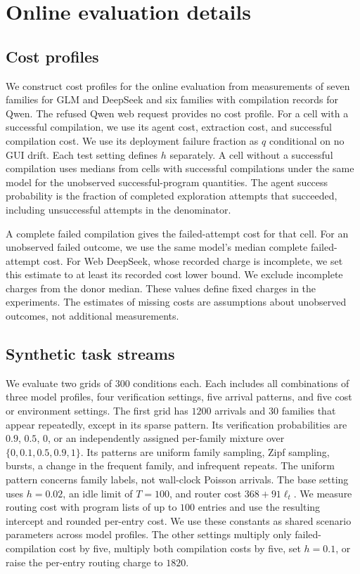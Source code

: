 \section{Online evaluation details}\label{app:simulation-details}

\subsection{Cost profiles}
\label{app:cost-profiles}

We construct cost profiles for the online evaluation from measurements of seven families for GLM and DeepSeek and six families with compilation records for Qwen.
The refused Qwen web request provides no cost profile.
For a cell with a successful compilation, we use its agent cost, extraction cost, and successful compilation cost.
We use its deployment failure fraction as $q$ conditional on no GUI drift.
Each test setting defines $h$ separately.
A cell without a successful compilation uses medians from cells with successful compilations under the same model for the unobserved successful-program quantities.
The agent success probability is the fraction of completed exploration attempts that succeeded, including unsuccessful attempts in the denominator.

A complete failed compilation gives the failed-attempt cost for that cell.
For an unobserved failed outcome, we use the same model's median complete failed-attempt cost.
For Web DeepSeek, whose recorded charge is incomplete, we set this estimate to at least its recorded cost lower bound.
We exclude incomplete charges from the donor median.
These values define fixed charges in the experiments.
The estimates of missing costs are assumptions about unobserved outcomes, not additional measurements.

\subsection{Synthetic task streams}
We evaluate two grids of $300$ conditions each.
Each includes all combinations of three model profiles, four verification settings, five arrival patterns, and five cost or environment settings.
The first grid has $1200$ arrivals and $30$ families that appear repeatedly, except in its sparse pattern.
Its verification probabilities are $0.9$, $0.5$, $0$, or an independently assigned per-family mixture over $\{0,0.1,0.5,0.9,1\}$.
Its patterns are uniform family sampling, Zipf sampling, bursts, a change in the frequent family, and infrequent repeats.
The uniform pattern concerns family labels, not wall-clock Poisson arrivals.
The base setting uses $h=0.02$, an idle limit of $T=100$, and router cost $368+91\ell_t$.
We measure routing cost with program lists of up to $100$ entries and use the resulting intercept and rounded per-entry cost.
We use these constants as shared scenario parameters across model profiles.
The other settings multiply only failed-compilation cost by five, multiply both compilation costs by five, set $h=0.1$, or raise the per-entry routing charge to $1820$.

